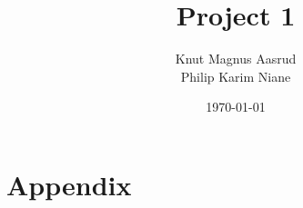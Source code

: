 \documentclass{article}
\title{Project 1}
\author{Knut Magnus Aasrud \\ Philip Karim Niane}
\date{\today}
\begin{document}
\maketitle













\section{Appendix}

\end{document}
